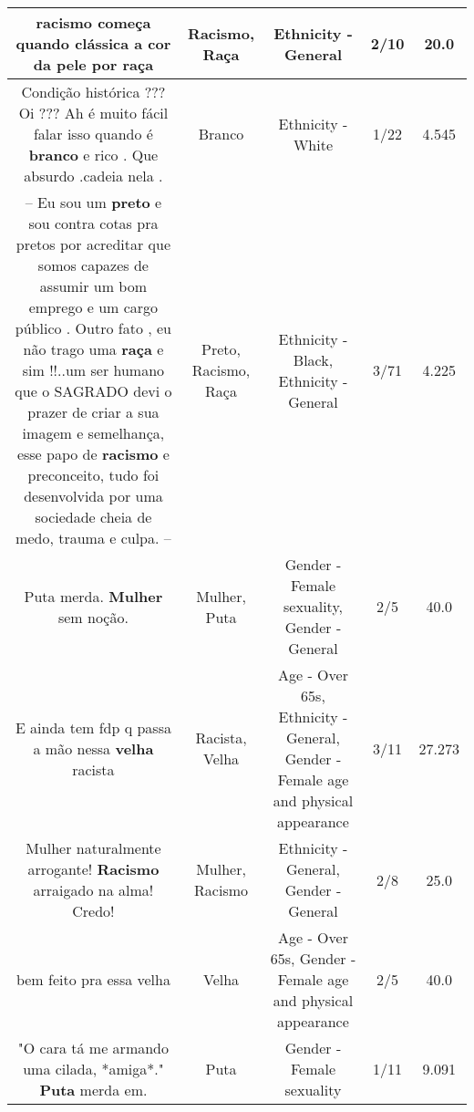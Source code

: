 \documentclass[11pt]{article}
\newlength\mylength
\begin{document}
\begin{center}
\begin{longtable}{|C{.65\mylength}|C{.30\mylength}|C{.12\mylength}|C{.12\mylength}|C{.12\mylength}|}
  \small racismo começa quando clássica a cor da pele por raça\normalsize   & Racismo, Raça & Ethnicity - General & 2/10 & 20.0 \\  \hline
  \small Condição histórica ??? Oi ??? Ah é muito fácil falar isso quando é \textbf{branco} e rico . Que absurdo .cadeia nela .\normalsize   & Branco & Ethnicity - White & 1/22 & 4.545 \\  \hline
  \small -- Eu sou um \textbf{preto} e sou contra cotas pra pretos por acreditar  que somos  capazes de assumir um bom emprego e um cargo público . Outro fato , eu não trago uma \textbf{raça} e sim !!..um ser humano que o  SAGRADO devi o prazer de criar a sua imagem e semelhança,  esse papo de \textbf{racismo} e preconceito,  tudo foi desenvolvida por uma sociedade cheia de medo, trauma e culpa. --\normalsize   & Preto, Racismo, Raça & Ethnicity - Black, Ethnicity - General & 3/71 & 4.225 \\  \hline
  \small Puta merda. \textbf{Mulher} sem noção.\normalsize   & Mulher, Puta & Gender - Female sexuality, Gender - General & 2/5 & 40.0 \\  \hline
  \small E ainda tem fdp q passa a mão nessa \textbf{v\textbf{elha}} racista\normalsize   & Racista, Velha & Age - Over 65s, Ethnicity - General, Gender - Female age and physical appearance & 3/11 & 27.273 \\  \hline
  \small Mulher naturalmente arrogante! \textbf{Racismo} arraigado na alma! Credo!\normalsize   & Mulher, Racismo & Ethnicity - General, Gender - General & 2/8 & 25.0 \\  \hline
  \small bem feito pra essa velha\normalsize   & Velha & Age - Over 65s, Gender - Female age and physical appearance & 2/5 & 40.0 \\  \hline
  \small "O cara tá me armando uma cilada, *amiga*."   \textbf{Puta} merda em.\normalsize   & Puta & Gender - Female sexuality & 1/11 & 9.091 \\  \hline

\end{longtable}
\end{center}
\end{document}
